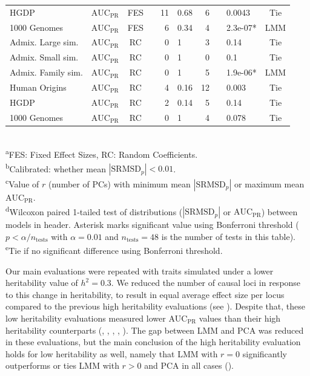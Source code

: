 \documentclass[9pt,lineno]{elife}
\newcommand{\rmsd}{\text{SRMSD}_p}
\newcommand{\auc}{\text{AUC}_\text{PR}}
\begin{document}
\begin{table}[bt]
\begin{fullwidth}
\begin{tabular}{lcc|crl|rclc}
      HGDP	&$\auc$	&FES	&	&11	&0.68	&6	&	&0.0043	&Tie \\
      1000 Genomes	&$\auc$	&FES	&	&6	&0.34	&4	&	&2.3e-07*	&LMM \\
      Admix. Large sim.	&$\auc$	&RC	&	&0	&1	&3	&	&0.14	&Tie \\
      Admix. Small sim.	&$\auc$	&RC	&	&0	&1	&0	&	&0.1	&Tie \\
      Admix. Family sim.	&$\auc$	&RC	&	&0	&1	&5	&	&1.9e-06*	&LMM \\
      Human Origins	&$\auc$	&RC	&	&4	&0.16	&12	&	&0.003	&Tie \\
      HGDP	&$\auc$	&RC	&	&2	&0.14	&5	&	&0.14	&Tie \\
      1000 Genomes	&$\auc$	&RC	&	&0	&1	&4	&	&0.078	&Tie \\
      \bottomrule
    \end{tabular}
    \\
    \textsuperscript{a}FES: Fixed Effect Sizes, RC: Random Coefficients.\\
    \textsuperscript{b}Calibrated: whether mean $|\rmsd| < 0.01$.\\
    \textsuperscript{c}Value of $r$ (number of PCs) with minimum mean $|\rmsd|$ or maximum mean $\auc$.\\
    \textsuperscript{d}Wilcoxon paired 1-tailed test of distributions ($|\rmsd|$ or $\auc$) between models in header.
    Asterisk marks significant value using Bonferroni threshold ($p < \alpha/n_\text{tests}$ with $\alpha = 0.01$ and $n_\text{tests} = 48$ is the number of tests in this table).\\
    \textsuperscript{e}Tie if no significant difference using Bonferroni threshold.
  \end{fullwidth}
\end{table}

Our main evaluations were repeated with traits simulated under a lower heritability value of $h^2 = 0.3$.
We reduced the number of causal loci in response to this change in heritability, to result in equal average effect size per locus compared to the previous high heritability evaluations (see ).
Despite that, these low heritability evaluations measured lower $\auc$ values than their high heritability counterparts (, , , , ).
The gap between LMM and PCA was reduced in these evaluations, but the main conclusion of the high heritability evaluation holds for low heritability as well, namely that LMM with $r=0$ significantly outperforms or ties LMM with $r > 0$ and PCA in all cases ().
\end{document}

